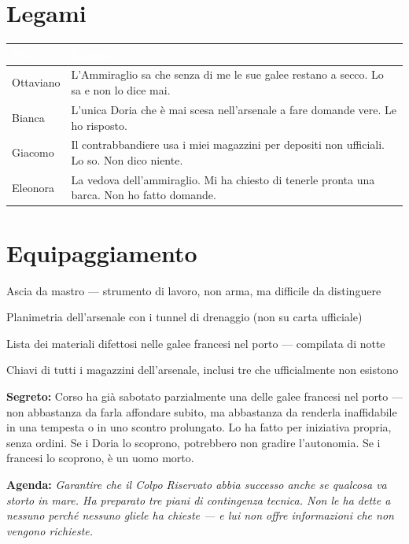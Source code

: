 \section*{Legami}

\begin{table}[h]
\centering\renewcommand{\arraystretch}{1.4}
\begin{tabularx}{\linewidth}{@{}L{2.4cm} X@{}}
  \toprule{}
  \textcolor{white}{\textbf{PG}} & \textcolor{white}{\textbf{Legame}} \\
  \midrule
  Ottaviano & L'Ammiraglio sa che senza di me le sue galee restano a secco. Lo sa e non lo dice mai. \\
  Bianca & L'unica Doria che è mai scesa nell'arsenale a fare domande vere. Le ho risposto. \\
  Giacomo & Il contrabbandiere usa i miei magazzini per depositi non ufficiali. Lo so. Non dico niente. \\
  Eleonora & La vedova dell'ammiraglio. Mi ha chiesto di tenerle pronta una barca. Non ho fatto domande. \\
  \bottomrule
\end{tabularx}
\end{table}

\section*{Equipaggiamento}
\begin{goldlist}
  \item Ascia da mastro — strumento di lavoro, non arma, ma difficile da distinguere
  \item Planimetria dell'arsenale con i tunnel di drenaggio (non su carta ufficiale)
  \item Lista dei materiali difettosi nelle galee francesi nel porto — compilata di notte
  \item Chiavi di tutti i magazzini dell'arsenale, inclusi tre che ufficialmente non esistono
\end{goldlist}


\begin{secretbox}
  \textbf{Segreto:} Corso ha già sabotato parzialmente una delle galee francesi nel
  porto — non abbastanza da farla affondare subito, ma abbastanza da renderla
  inaffidabile in una tempesta o in uno scontro prolungato. Lo ha fatto per
  iniziativa propria, senza ordini. Se i Doria lo scoprono, potrebbero non
  gradire l'autonomia. Se i francesi lo scoprono, è un uomo morto.

  \medskip\noindent\textcolor{SecretRed}{\textbf{Agenda:}}
  \textit{Garantire che il Colpo Riservato abbia successo anche se qualcosa va
  storto in mare. Ha preparato tre piani di contingenza tecnica. Non le ha
  dette a nessuno perché nessuno gliele ha chieste — e lui non offre informazioni
  che non vengono richieste.}
\end{secretbox}


